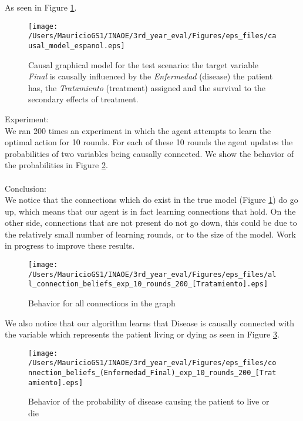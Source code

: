 \documentclass[english,letterpaper,12pt,final]{article}
\theoremstyle{definition}
\begin{document}
As seen in Figure \ref{causal_model}.

\begin{figure}[ht]
\vskip 0.2in
\begin{center}
\centerline{\texttt{[image: /Users/MauricioGS1/INAOE/3rd\_year\_eval/Figures/eps\_files/causal\_model\_espanol.eps]}}
\caption{Causal graphical model for the test scenario: the target variable \textit{Final} is causally influenced by the \textit{Enfermedad} (disease) the patient has, the \textit{Tratamiento} (treatment) assigned and the survival to the secondary effects of treatment.}
\label{causal_model}
\end{center}
\vskip -0.2in
\end{figure}
\newpage
Experiment:\\
We ran 200 times an experiment in which the agent attempts to learn the optimal action for 10 rounds. For each of these 10 rounds the agent updates the probabilities of two variables being causally connected. We show the behavior of the probabilities in Figure \ref{All_beliefs}.\\
\\
Conclusion:\\
We notice that the connections which do exist in the true model (Figure \ref{causal_model}) do go up, which means that our agent is in fact learning connections that hold. On the other side, connections that are not present do not go down, this could be due to the relatively small number of learning rounds, or to the size of the model. Work in progress to improve these results.
\begin{figure}[ht]
\vskip 0.2in
\begin{center}
\centerline{\texttt{[image: /Users/MauricioGS1/INAOE/3rd\_year\_eval/Figures/eps\_files/all\_connection\_beliefs\_exp\_10\_rounds\_200\_[Tratamiento].eps]}}
\caption{Behavior for all connections in the graph}
\label{All_beliefs}
\end{center}
\vskip -0.2in
\end{figure}
We also notice that our algorithm learns that Disease is causally connected with the variable which represents the patient living or dying as seen in Figure \ref{disease_live}.
\newpage
\begin{figure}[ht]
\vskip 0.2in
\begin{center}
\centerline{\texttt{[image: /Users/MauricioGS1/INAOE/3rd\_year\_eval/Figures/eps\_files/connection\_beliefs\_(Enfermedad\_Final)\_exp\_10\_rounds\_200\_[Tratamiento].eps]}}
\caption{Behavior of the probability of disease causing the patient to live or die}
\label{disease_live}
\end{center}
\vskip -0.2in
\end{figure}
\end{document}

